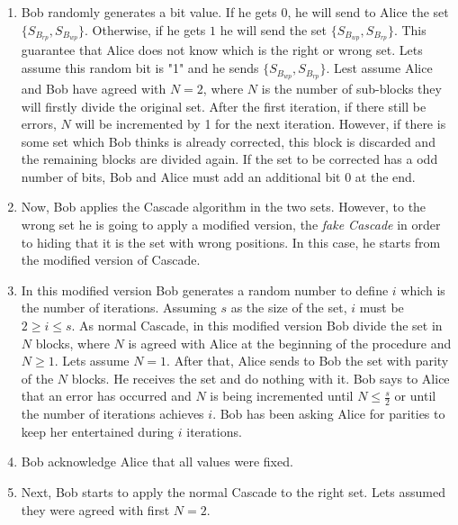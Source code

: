 \begin{enumerate}
      \begin{enumerate}
        \item Bob randomly generates a bit value. If he gets $0$, he will send to Alice the set $\{ S_{B_{rp}}, S_{B_{wp}}\}$. Otherwise, if he gets $1$ he will send the set $\{S_{B_{wp}}, S_{B_{rp}}\}$. This guarantee that Alice does not know which is the right or wrong set. Lets assume this random bit is "1" and he sends $\{S_{B_{wp}}, S_{B_{rp}}\}$. Lest assume Alice and Bob have agreed with $N=2$, where $N$ is the number of sub-blocks they will firstly divide the original set. After the first iteration, if there still be errors, $N$ will be incremented by 1 for the next iteration. However, if there is some set which Bob thinks is already corrected, this block is discarded and the remaining blocks are divided again.
            If the set to be corrected has a odd number of bits, Bob and Alice must add an additional bit $0$ at the end.

            \label{itema}

        \item Now, Bob applies the Cascade algorithm in the two sets. However, to the wrong set he is going to apply a modified version, the \textit{fake Cascade} in order to hiding that it is the set with wrong positions. In this case, he starts from the modified version of Cascade.

        \item In this modified version Bob generates a random number to define $i$ which is the number of iterations. Assuming $s$ as the size of the set, $i$ must be $ 2 \geq i \leq s $.
            As normal Cascade, in this modified version Bob divide the set in $N$ blocks, where $N$ is agreed with Alice at the beginning of the procedure and $N\geq1$. Lets assume $N=1$. After that, Alice sends to Bob the set with parity of the $N$ blocks. He receives the set and do nothing with it. Bob says to Alice that an error has occurred and $N$ is being incremented until $N \leq \frac{s}{2}$ or until the number of iterations achieves $i$. Bob has been asking Alice for parities to keep her entertained during $i$ iterations.

        \item Bob acknowledge Alice that all values were fixed.

        \item Next, Bob starts to apply the normal Cascade to the right set. Lets assumed they were agreed with first $N=2$.


\end{enumerate}
\end{enumerate}
